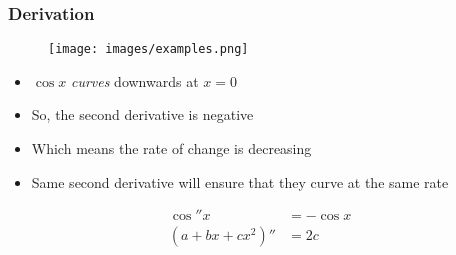 \documentclass{beamer}
\begin{document}
\begin{frame}
  \frametitle{Derivation}
  \begin{figure}[ht]
    \centering
    \texttt{[image: images/examples.png]}
  \end{figure}
  \begin{itemize}
    \item \( \cos x \) \textit{curves} downwards at \( x = 0 \)
    \item So, the second derivative is negative
    \item Which means the rate of change is decreasing
    \item Same second derivative will ensure that they curve at the same rate
  \end{itemize}
  \begin{align*}
    \cos'' x &= -\cos x \\
    (a + bx + cx^2)'' &= 2c
  \end{align*}
\end{frame}
\end{document}
